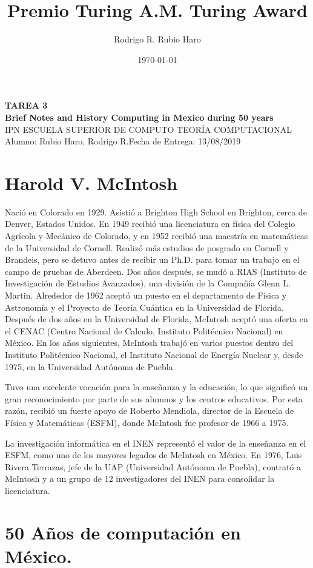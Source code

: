 \documentclass[notitlepage,letterpaper, 11pt]{article}
\title{Premio Turing \textbar \hspace{.1mm} A.M. Turing Award}
\author{Rodrigo R. Rubio Haro}
\date{\today} %
\begin{document}
\noindent
\large\textbf{TAREA 3} \\
\textbf{Brief Notes and History Computing in Mexico
during 50 years} \\
\normalsize IPN \textbar ESCUELA SUPERIOR DE COMPUTO \textbar TEORÍA COMPUTACIONAL \\
Alumno: Rubio Haro, Rodrigo R.\hfill Fecha de Entrega: 13/08/2019 \\
 

\section*{Harold V. McIntosh}

\noindent Nació en Colorado en 1929. Asistió a Brighton High School en Brighton, cerca de Denver, Estados Unidos. 
En 1949 recibió una licenciatura en física del Colegio Agrícola y Mecánico de Colorado, y en 1952 recibió una maestría en matemáticas de la Universidad de Cornell. Realizó más estudios de posgrado en Cornell y Brandeis, pero se detuvo antes de recibir un Ph.D. para tomar un trabajo en el campo de pruebas de Aberdeen. Dos años después, se mudó a RIAS (Instituto de Investigación de Estudios Avanzados), una división de la Compañía Glenn L. Martin. Alrededor de 1962 aceptó un puesto en el departamento de Física y Astronomía y el Proyecto de Teoría Cuántica en la Universidad de Florida. Después de dos años en la Universidad de Florida, McIntosh aceptó una oferta en el CENAC (Centro Nacional de Calculo, Instituto Politécnico Nacional) en México. En los años siguientes, McIntosh trabajó en varios puestos dentro del Instituto Politécnico Nacional, el Instituto Nacional de Energía Nuclear y, desde 1975, en la Universidad Autónoma de Puebla.

\noindent Tuvo una excelente vocación para la enseñanza y la educación, lo que significó un gran reconocimiento por parte de sus alumnos y los centros educativos. Por esta razón, recibió un fuerte apoyo de Roberto Mendiola, director de la Escuela de Física y Matemáticas (ESFM), donde McIntosh fue profesor de 1966 a 1975.

\noindent La investigación informática en el INEN representó el valor de la enseñanza en el ESFM, como uno de los mayores legados de McIntosh en México.
En 1976, Luis Rivera Terrazas, jefe de la UAP (Universidad Autónoma de Puebla), contrató a McIntosh y a un grupo de 12 investigadores del INEN para consolidar la licenciatura.

\newpage
\section*{50 Años de computación en México.}
\end{document}
